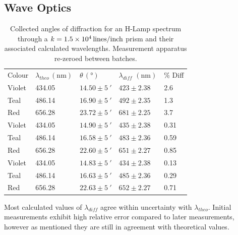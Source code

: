 \documentclass[10pt, twocolumn]{article}
\theoremstyle{definition}
\begin{document}
\subsection{Wave Optics}
\begin{table}[ht!]
  \centering%
  \caption{Collected angles of diffraction for an H-Lamp spectrum through a $k=\qty{1.5d4}{lines\per inch}$ prism and their associated calculated wavelengths. Measurement apparatus re-zeroed between batches.\\}
  \begin{tabular}{lllll}
    \toprule
    Colour & $\lambda_{theo}\, (\unit{\nano\meter})$ & $\theta\, (\unit{\degree})$   & $\lambda_{diff}$ $(\unit{\nano\meter})$ & \% Diff \\
    Violet & 434.05                                  & $14.50\pm\qty{5}{\arcminute}$ & $423\pm2.38$                         & 2.6     \\
    Teal   & 486.14                                  & $16.90\pm\qty{5}{\arcminute}$ & $492\pm2.35$                         & 1.3     \\
    Red    & 656.28                                  & $23.72\pm\qty{5}{\arcminute}$ & $681\pm2.25$                         & 3.7     \\
    \midrule
    Violet & 434.05                                  & $14.90\pm\qty{5}{\arcminute}$ & $435\pm2.38$                         & 0.31    \\
    Teal   & 486.14                                  & $16.58\pm\qty{5}{\arcminute}$ & $483\pm2.36$                         & 0.59    \\
    Red    & 656.28                                  & $22.60\pm\qty{5}{\arcminute}$ & $651\pm2.27$                         & 0.85    \\
    \midrule
    Violet & 434.05                                  & $14.83\pm\qty{5}{\arcminute}$ & $434\pm2.38$                         & 0.13    \\
    Teal   & 486.14                                  & $16.63\pm\qty{5}{\arcminute}$ & $485\pm2.36$                         & 0.29    \\
    Red    & 656.28                                  & $22.63\pm\qty{5}{\arcminute}$ & $652\pm2.27$                         & 0.71    \\
    \bottomrule
  \end{tabular}
\end{table}
Most calculated values of $\lambda_{diff}$ agree within uncertainty with $\lambda_{theo}$. Initial measurements exhibit high relative error compared to later measurements, however
as mentioned they are still in agreement with theoretical values.
\end{document}
